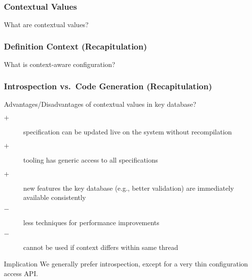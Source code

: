 \begin{frame}
	\frametitle{Contextual Values}

	\begin{task}
	What are contextual values?
	\end{task}

	\pause

\end{frame}

\begin{frame}
	\frametitle{Definition Context (Recapitulation)}

	\begin{task}
	What is context-aware configuration?
	\end{task}

	\pause

\end{frame}

\begin{frame}
	\frametitle{Introspection vs.\ Code Generation (Recapitulation)}

	\begin{task}
	Advantages/Disadvantages of contextual values in key database?
	\end{task}

	\pause

	\begin{description} %
	\item[$+$] specification can be updated live on the system without recompilation
	\item[$+$] tooling has generic access to all specifications
 	\item[$+$] new features the key database (e.g., better validation) are immediately available consistently
	\item[$-$] less techniques for performance improvements
	\item[$-$] cannot be used if context differs within same thread
	\end{description}

	\begin{alertblock}{Implication}
	We generally prefer introspection, except for a very thin configuration access API.
	\end{alertblock}
\end{frame}

